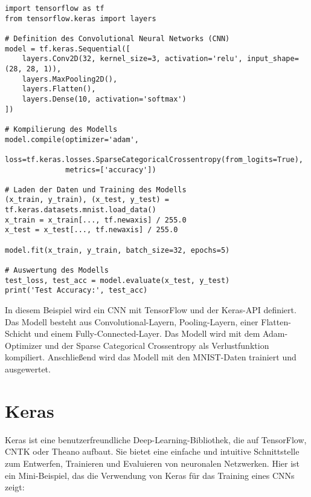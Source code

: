 \begin{lstlisting}
import tensorflow as tf
from tensorflow.keras import layers

# Definition des Convolutional Neural Networks (CNN)
model = tf.keras.Sequential([
    layers.Conv2D(32, kernel_size=3, activation='relu', input_shape=(28, 28, 1)),
    layers.MaxPooling2D(),
    layers.Flatten(),
    layers.Dense(10, activation='softmax')
])

# Kompilierung des Modells
model.compile(optimizer='adam',
              loss=tf.keras.losses.SparseCategoricalCrossentropy(from_logits=True),
              metrics=['accuracy'])

# Laden der Daten und Training des Modells
(x_train, y_train), (x_test, y_test) = tf.keras.datasets.mnist.load_data()
x_train = x_train[..., tf.newaxis] / 255.0
x_test = x_test[..., tf.newaxis] / 255.0

model.fit(x_train, y_train, batch_size=32, epochs=5)

# Auswertung des Modells
test_loss, test_acc = model.evaluate(x_test, y_test)
print('Test Accuracy:', test_acc)
\end{lstlisting}

In diesem Beispiel wird ein CNN mit TensorFlow und der Keras-API definiert. Das Modell besteht aus Convolutional-Layern, Pooling-Layern, einer Flatten-Schicht und einem Fully-Connected-Layer. Das Modell wird mit dem Adam-Optimizer und der Sparse Categorical Crossentropy als Verlustfunktion kompiliert. Anschließend wird das Modell mit den MNIST-Daten trainiert und ausgewertet.

\section{Keras}
Keras ist eine benutzerfreundliche Deep-Learning-Bibliothek, die auf TensorFlow, CNTK oder Theano aufbaut. Sie bietet eine einfache und intuitive Schnittstelle zum Entwerfen, Trainieren und Evaluieren von neuronalen Netzwerken. Hier ist ein Mini-Beispiel, das die Verwendung von Keras für das Training eines CNNs zeigt:

